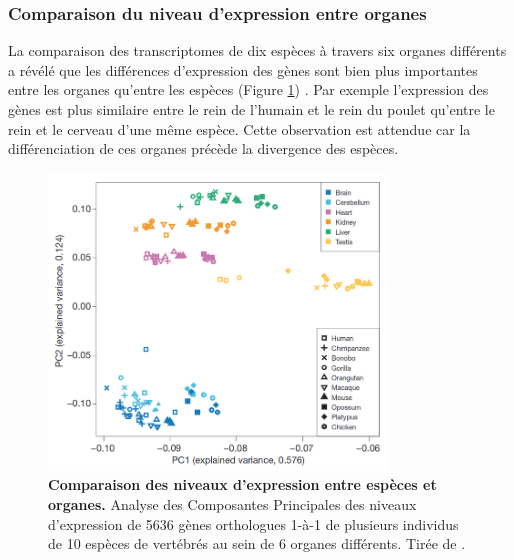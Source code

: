 \subsubsection{Comparaison du niveau d’expression entre organes}
\label{subsub:variation-organes}

La comparaison des \glspl{transcriptome} de dix espèces à travers six organes différents a révélé que les différences d’expression des gènes sont bien plus importantes entre les organes qu’entre les espèces (Figure \ref{fig:Fig28}) \citep{brawand_evolution_2011}. Par exemple l’expression des gènes est plus similaire entre le rein de l’humain et le rein du poulet qu’entre le rein et le cerveau d’une même espèce. Cette observation est attendue car la différenciation de ces organes précède la divergence des espèces.\\

\begin{figure}[h]
 \centering
 \includegraphics[width=0.8\textwidth, page=1] {figures/introduction/fig28.png}
 \caption[Comparaison des niveaux d'expression entre espèces et organes.]{
 \textbf{Comparaison des niveaux d'expression entre espèces et organes.}
 Analyse des Composantes Principales des niveaux d'expression de 5636 gènes orthologues 1-à-1 de plusieurs individus de 10 espèces de vertébrés au sein de 6 organes différents.
 Tirée de \citet{brawand_evolution_2011}.\\
 }
 \label{fig:Fig28}
\end{figure}


